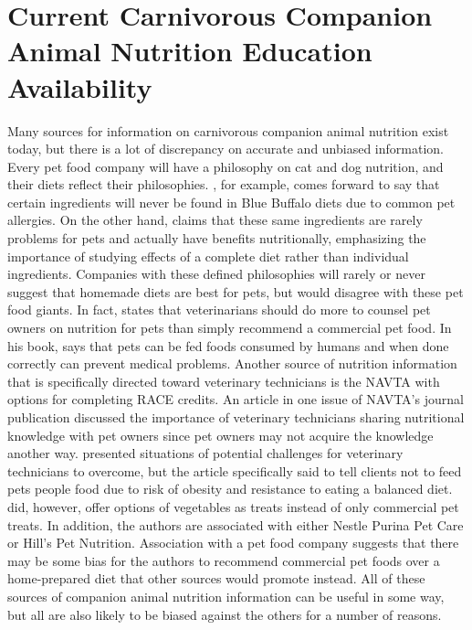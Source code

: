 \section{Current Carnivorous Companion Animal Nutrition Education Availability}
Many sources for information on carnivorous companion animal nutrition exist today, but there is a lot of discrepancy on accurate and unbiased information. Every pet food company will have a philosophy on cat and dog nutrition, and their diets reflect their philosophies. \cite{blue}, for example, comes forward to say that certain ingredients will never be found in Blue Buffalo diets due to common pet allergies. On the other hand, \cite{purina} claims that these same ingredients are rarely problems for pets and actually have benefits nutritionally, emphasizing the importance of studying effects of a complete diet rather than individual ingredients. Companies with these defined philosophies will rarely or never suggest that homemade diets are best for pets, but \cite{strombeck} would disagree with these pet food giants. In fact, \cite{strombeck} states that veterinarians should do more to counsel pet owners on nutrition for pets than simply recommend a commercial pet food. In his book, \cite{strombeck} says that pets can be fed foods consumed by humans and when done correctly can prevent medical problems. Another source of nutrition information that is specifically directed toward veterinary technicians is the NAVTA with options for completing RACE credits\citep{ce}. An article in one issue of NAVTA's journal publication discussed the importance of veterinary technicians sharing nutritional knowledge with pet owners since pet owners may not acquire the knowledge another way\citep{burns}.  \cite{burns} presented situations of potential challenges for veterinary technicians to overcome, but the article specifically said to tell clients not to feed pets people food due to risk of obesity and resistance to eating a balanced diet. \cite{burns} did, however, offer options of vegetables as treats instead of only commercial pet treats. In addition, the authors are associated with either Nestle Purina Pet Care or Hill's Pet Nutrition\citep{burns}. Association with a pet food company suggests that there may be some bias for the authors to recommend commercial pet foods over a home-prepared diet that other sources would promote instead. All of these sources of companion animal nutrition information can be useful in some way, but all are also likely to be biased against the others for a number of reasons. 

